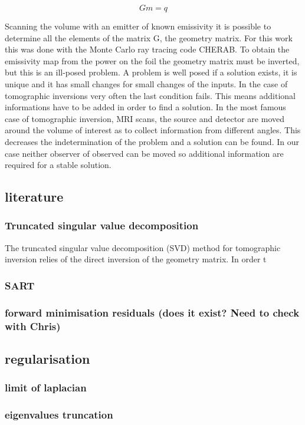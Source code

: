 \begin{equation}
Gm=q
\label{eq:gmq}
\end{equation}

Scanning the volume with an emitter of known emissivity it is possible to determine all the elements of the matrix G, the geometry matrix. For this work this was done with the Monte Carlo ray tracing code CHERAB. To obtain the emissivity map from the power on the foil the geometry matrix must be inverted, but this is an ill-posed problem. A problem is well posed if a solution exists, it is unique and it has small changes for small changes of the inputs. \cite{Hansen1998} In the case of tomographic inversions very often the last condition fails. \cite{Hansen2010} This means additional informations have to be added in order to find a solution. In the most famous case of tomographic inversion, MRI scans, the source and detector are moved around the volume of interest as to collect information from different angles. This decreases the indetermination of the problem and a solution can be found. In our case neither observer of observed can be moved so additional information are required for a stable solution.
\subsection{literature}
\subsubsection{Truncated singular value decomposition}
The truncated singular value decomposition (SVD) method for tomographic inversion relies of the direct inversion of the geometry matrix. In order t 
\subsubsection {SART}
\subsubsection{forward minimisation residuals (does it exist? Need to check with Chris)}
\subsection{regularisation}
\subsubsection{limit of laplacian}
\subsubsection{eigenvalues truncation}
